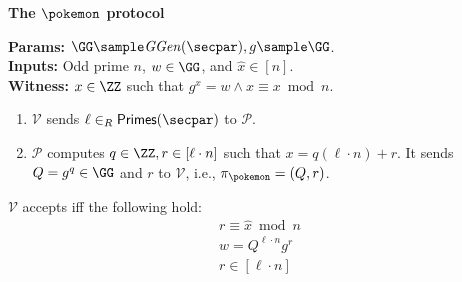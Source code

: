 \begin{mdframed}
\begin{center}
    \textbf{The $\pokemon$ protocol}
\end{center}
\noindent\textbf{Params:} $\GG \sample \mathit{GGen}(\secpar), g \sample \GG$.\hfill\\
\textbf{Inputs:} Odd prime $n$, $w\in\GG$, and $\hat{x} \in [n]$.\hfill\\
\textbf{Witness:} $x\in\ZZ$ such that $g^x=w\land \hat{x} \equiv x\bmod{n}$.
\begin{enumerate}
    \item $\mathcal{V}$ sends $\ell \in_{R}\mathsf{Primes}(\secpar)$ to $\mathcal{P}$.
    \item $\mathcal{P}$ computes $q\in\ZZ, r\in[\ell \cdot n]$ such that $x=q(\ell \cdot n)+r$. It sends $Q=g^q\in\GG$ and $r$ to $\mathcal{V}$, i.e., $\pi_{\pokemon}=(Q,r)$.
\end{enumerate}
$\mathcal{V}$ accepts iff the following hold:
\begin{align*}
    r\equiv\hat{x}\bmod{n} \\
    w = Q^{\ell \cdot n}g^{r}\\
    r\in[\ell \cdot n]
\end{align*}
\end{mdframed}
